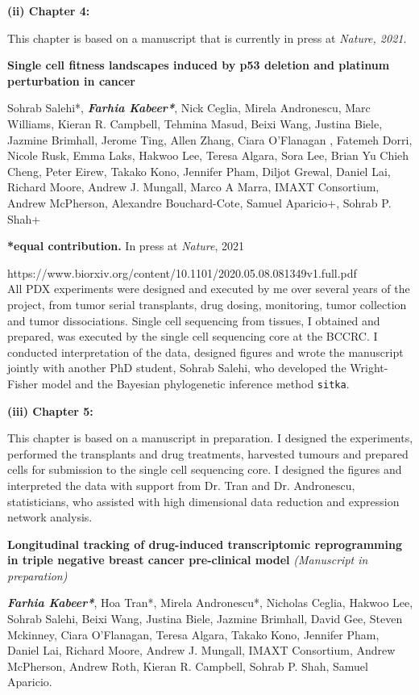 
  \textbf{(ii) Chapter 4:}

This chapter is based on a manuscript that is currently in press at \textit{Nature, 2021}.


 \textbf{Single  cell  fitness  landscapes  induced  by  p53  deletion and platinum perturbation in cancer}

Sohrab Salehi*, \emph{\textbf{Farhia Kabeer*}}, Nick Ceglia, Mirela Andronescu, Marc Williams, Kieran R. Campbell, Tehmina Masud, Beixi Wang, Justina Biele, Jazmine Brimhall, Jerome Ting, Allen Zhang, Ciara O'Flanagan , Fatemeh Dorri, Nicole Rusk, Emma Laks, Hakwoo Lee, Teresa Algara, Sora Lee, Brian Yu Chieh Cheng, Peter Eirew, Takako Kono, Jennifer Pham, Diljot Grewal, Daniel Lai, Richard Moore, Andrew J. Mungall, Marco A Marra, IMAXT Consortium, Andrew McPherson, Alexandre Bouchard-Cote, Samuel Aparicio+, Sohrab P. Shah+

 \textbf{*equal contribution.} In press at \textit{Nature}, 2021

https://www.biorxiv.org/content/10.1101/2020.05.08.081349v1.full.pdf
\\
 All PDX experiments were designed and executed by me over several years of the project, from tumor serial transplants, drug dosing, monitoring, tumor collection and tumor dissociations. Single cell sequencing from tissues, I obtained and prepared, was executed by the single cell sequencing core at the BCCRC. I conducted interpretation of the data, designed figures and wrote the manuscript jointly with another PhD student, Sohrab Salehi, who developed the Wright-Fisher model and the Bayesian phylogenetic inference method \texttt{sitka}.  


  \textbf{(iii) Chapter 5:}
   
This chapter is based on a manuscript in preparation. I designed the experiments, performed the transplants and drug treatments, harvested tumours and prepared cells for submission to the single cell sequencing core. I designed the figures and interpreted the data with support from Dr. Tran and Dr. Andronescu, statisticians, who assisted with high dimensional data reduction and expression network analysis.
  
\textbf{Longitudinal tracking of drug-induced transcriptomic reprogramming in triple negative breast cancer pre-clinical model} \textit{(Manuscript in preparation)}

\emph{\textbf{Farhia Kabeer*}}, Hoa Tran*, Mirela Andronescu*,   
Nicholas Ceglia, Hakwoo Lee, Sohrab Salehi, Beixi Wang, Justina Biele, Jazmine Brimhall, David Gee, Steven Mckinney, Ciara O'Flanagan, Teresa Algara, Takako Kono, Jennifer Pham, Daniel Lai, Richard Moore, Andrew J. Mungall, IMAXT Consortium,  Andrew  McPherson, Andrew Roth, Kieran R. Campbell, Sohrab P. Shah, Samuel Aparicio.
